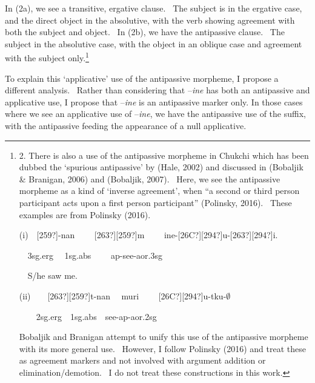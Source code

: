 \documentclass[12pt]{article}
\newenvironment{styleStandard}{\setlength\leftskip{0cm}\setlength\rightskip{0cm plus 1fil}\setlength\parindent{0cm}\setlength\parfillskip{0pt plus 1fil}\setlength\parskip{0in plus 1pt}\writerlistparindent\writerlistleftskip\leavevmode\normalfont\normalsize\writerlistlabel\ignorespaces}{\unskip\vspace{0.111in plus 0.0111in}\par}
\newcommand\writerlistleftskip{}
\newcommand\writerlistparindent{}
\newcommand\writerlistlabel{}
\begin{document}
\begin{styleStandard}
In (2a), we see a transitive, ergative clause. \ The subject is in the ergative case, and the direct object in the absolutive, with the verb showing agreement with both the subject and object. \ In (2b), we have the antipassive clause. \ The subject in the absolutive case, with the object in an oblique case and agreement with the subject only.\footnote{2. There is also a use of the antipassive morpheme in Chukchi which has been dubbed the ‘spurious antipassive’ by (Hale, 2002) and discussed in (Bobaljik \& Branigan, 2006) and (Bobaljik, 2007). \ Here, we see the antipassive morpheme as a kind of ‘inverse agreement’, when “a second or third person participant acts upon a first person participant” (Polinsky, 2016). \ These examples are from Polinsky (2016).\par (i)\ \ [259?]-nan \ \ \ \ [263?][259?]m \ \ \ \ ine-[26C?][294?]u-[263?][294?]i. \par \ \ 3\textrm{sg.erg \ \ }1\textrm{sg.abs }\ \ \ \ \textrm{ap}{}-see-\textrm{aor}.3\textrm{sg} \par \ \ S/he saw me.\par \par (ii)\ \ \ \ [263?][259?]t-nan \ \ muri \ \ \ \ [26C?][294?]u-tku-\textrm{${\emptyset}$}\par \ \ \ \ 2\textrm{sg}.\textrm{erg}\ \ 1\textrm{sg.abs\ \ }see-\textrm{ap-aor}.2\textrm{sg}\par \par Bobaljik and Branigan attempt to unify this use of the antipassive morpheme with its more general use. \ However, I follow Polinsky (2016) and treat these as agreement markers and not involved with argument addition or elimination/demotion. \ I do not treat these constructions in this work.} 
\end{styleStandard}

\begin{styleStandard}
To explain this ‘applicative’ use of the antipassive morpheme, I propose a different analysis. \ Rather than considering that –\textit{ine} has both an antipassive and applicative use, I propose that –\textit{ine} is an antipassive marker only. In those cases where we see an applicative use of –\textit{ine}, we have the antipassive use of the suffix, with the antipassive feeding the appearance of a null applicative.
\end{styleStandard}
\end{document}
